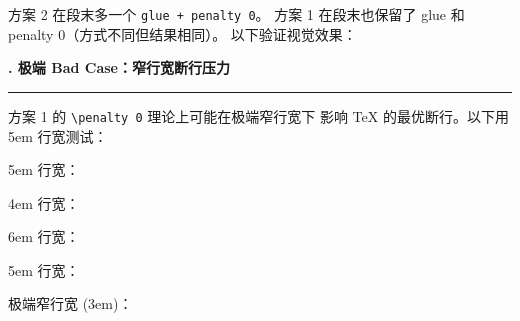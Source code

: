 \documentclass{article}
\begin{document}
{\small 方案 2 在段末多一个 \texttt{glue + penalty 0}。
方案 1 在段末也保留了 glue 和 penalty 0（方式不同但结果相同）。
以下验证视觉效果：}

\medskip
\begin{minipage}[t]{0.48\linewidth}
\end{minipage}%
\hfill
\begin{minipage}[t]{0.48\linewidth}
\end{minipage}

\medskip
{}


\bigskip

{\large\bfseries{}. 极端 Bad Case：窄行宽断行压力}
\smallskip\hrule\smallskip

{\small 方案 1 的 \texttt{\textbackslash penalty 0} 理论上可能在极端窄行宽下
影响 \TeX{} 的最优断行。以下用 5em 行宽测试：}

\medskip
\begin{minipage}[t]{0.22\linewidth}
{\small\sffamily 5em 行宽：}

\end{minipage}%
\hfill
\begin{minipage}[t]{0.22\linewidth}
{\small\sffamily 4em 行宽：}

\end{minipage}%
\hfill
\begin{minipage}[t]{0.22\linewidth}
{\small\sffamily 6em 行宽：}

\end{minipage}%
\hfill
\begin{minipage}[t]{0.22\linewidth}
{\small\sffamily 5em 行宽：}

\end{minipage}

\medskip
{\small\sffamily 极端窄行宽 (3em)：}

\smallskip
{}\enspace
{}\enspace
{}\enspace
{}
\end{document}
